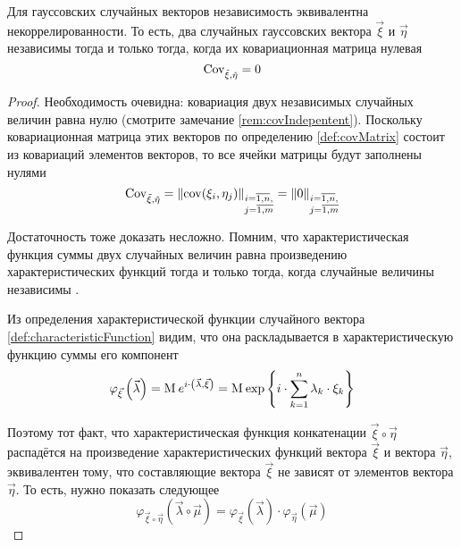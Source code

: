 \begin{theorem}
  \label{theorem:gaussianVector:independence}
  Для гауссовских случайных векторов независимость эквивалентна
  некоррелированности.
  То есть, два случайных гауссовских вектора $\vec{\xi}$ и $\vec{\eta}$
  независимы тогда и только тогда, когда их ковариационная матрица нулевая
  $$\operatorname{Cov^{}_{\vec{\xi}, \vec{\eta}}} = 0$$
\end{theorem}
\begin{proof}
  Необходимость очевидна: ковариация двух независимых случайных величин равна
  нулю (смотрите замечание \ref{rem:covIndepentent}). Поскольку
  ковариационная матрица этих векторов по определению \ref{def:covMatrix}
  состоит из ковариаций элементов векторов, то все ячейки матрицы будут
  заполнены нулями
  $$\operatorname{Cov^{}_{\vec{\xi}, \vec{\eta}}}
      = \left\| \operatorname{cov}\!\left( \xi_i, \eta_j \right) \right\|_{
      \substack{i= \overline{1,n},\\j= \overline{1,m}}}
      = \left\| 0 \right \|_{
      \substack{i= \overline{1,n},\\j= \overline{1,m}}}$$

  Достаточность тоже доказать несложно. Помним, что характеристическая
  функция суммы двух случайных величин равна произведению характеристических
  функций тогда и только тогда, когда случайные величины независимы
  \cite[с.~354]{Shiryayev1}.

  Из определения характеристической функции случайного вектора
  \ref{def:characteristicFunction} видим, что она раскладывается в
  характеристическую функцию суммы его компонент
  $$\varphi_{\vec{\xi}}\left( \vec{\lambda} \right)
      = \operatorname{M}_{} e^{i \cdot \left( \vec{\lambda}, \vec{\xi} \right)}
      = \operatorname{M}_{} 
      \exp{\left\{ i \cdot \sum_{k=1}^n \lambda_k \cdot \xi_k \right\}}$$

  Поэтому тот факт, что характеристическая функция конкатенации
  $\vec{\xi} \circ \vec{\eta}$ распадётся на произведение характеристических
  функций вектора $\vec{\xi}$ и вектора $\vec{\eta}$, эквивалентен тому, что
  составляющие вектора $\vec{\xi}$ не зависят от элементов вектора
  $\vec{\eta}$. То есть, нужно показать следующее
  $$\varphi_{\vec{\xi} \circ \vec{\eta}}\left(
      \vec{\lambda} \circ \vec{\mu} \right)
      = \varphi_{\vec{\xi}}\left( \vec{\lambda} \right)
      \cdot \varphi_{\vec{\eta}}\left( \vec{\mu} \right)$$


\end{proof}
